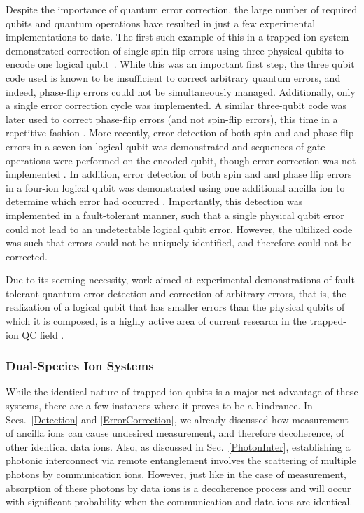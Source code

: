 \documentclass[%
reprint,
 amsmath,amssymb,
]{revtex4-1}
\begin{document}
Despite the importance of quantum error correction, the large number of required qubits and quantum operations have resulted in just a few experimental implementations to date.  The first such example of this in a trapped-ion system demonstrated correction of single spin-flip errors using three physical qubits to encode one logical qubit~\cite{ChiaveriniQEC2004}.  While this was an important first step, the three qubit code used is known to be insufficient to correct arbitrary quantum errors, and indeed, phase-flip errors could not be simultaneously managed.  Additionally, only a single error correction cycle was implemented.  A similar three-qubit code was later used to correct phase-flip errors (and not spin-flip errors), this time in a repetitive fashion \cite{SchindlerQEC2004}.  More recently, error detection of both spin and and phase flip errors in a seven-ion logical qubit was demonstrated and sequences of gate operations were performed on the encoded qubit, though error correction was not implemented \cite{NiggQED2014}.  In addition, error detection of both spin and and phase flip errors in a four-ion logical qubit was demonstrated using one additional ancilla ion to determine which error had occurred \cite{LinkeErrorDetection2017}.  Importantly, this detection was implemented in a fault-tolerant manner, such that a single physical qubit error could not lead to an undetectable logical qubit error.  However, the ultilized code was such that errors could not be uniquely identified, and therefore could not be corrected.

Due to  its seeming necessity, work aimed at experimental demonstrations of fault-tolerant quantum error detection and correction of arbitrary errors, that is, the realization of a logical qubit that has smaller errors than the physical qubits of which it is composed, is a highly active area of current research in the trapped-ion QC field \cite{BermudezAssessing2017, TroutSurfaceCodeSim2018}.

   \subsubsection{Dual-Species Ion Systems}
   \label{DualSpecies}
While the identical nature of trapped-ion qubits is a major net advantage of these systems, there are a few instances where it proves to be a hindrance.  In Secs.~\ref{Detection} and \ref{ErrorCorrection}, we already discussed how measurement of ancilla ions can cause undesired measurement, and therefore decoherence, of other identical data ions.  Also, as discussed in Sec.~\ref{PhotonInter}, establishing a photonic interconnect via remote entanglement involves the scattering of multiple photons by communication ions.  However, just like in the case of measurement, absorption of these photons by data ions is a decoherence process and will occur with significant probability when the communication and data ions are identical.
\end{document}
